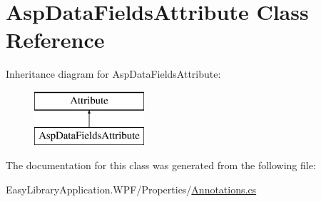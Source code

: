 \hypertarget{class_asp_data_fields_attribute}{}\section{Asp\+Data\+Fields\+Attribute Class Reference}
\label{class_asp_data_fields_attribute}
Inheritance diagram for Asp\+Data\+Fields\+Attribute\+:\begin{figure}[H]
\begin{center}
\leavevmode
\includegraphics[height=2.000000cm]{class_asp_data_fields_attribute}
\end{center}
\end{figure}


The documentation for this class was generated from the following file\+:\begin{DoxyCompactItemize}
\item 
Easy\+Library\+Application.\+W\+P\+F/\+Properties/\mbox{\hyperlink{_annotations_8cs}{Annotations.\+cs}}\end{DoxyCompactItemize}
